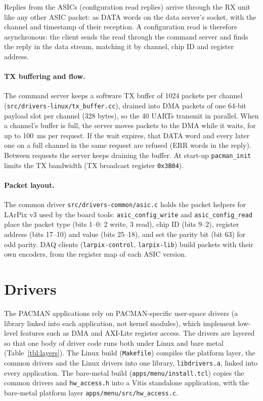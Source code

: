\documentclass[12pt]{article}
\newcommand{\hex}[1]{\texttt{0x#1}}
\newcommand{\f}[1]{\texttt{#1}}
\begin{document}
Replies from the ASICs (configuration read replies) arrive
through the RX unit like any other ASIC packet:  as DATA words on the data server's socket, with the
channel and timestamp of their reception.  A configuration read is therefore asynchronous:  the
client sends the read through the command server and finds the reply in the data stream, matching it
by channel, chip ID and register address.

\paragraph{TX buffering and flow.}  The command server keeps a software TX buffer of 1024 packets
per channel (\f{src/drivers-linux/tx\_buffer.cc}), drained into DMA packets of one 64-bit payload
slot per channel (328 bytes), so the 40 UARTs transmit in parallel.  When a channel's buffer is full,
the server moves packets to the DMA while it waits, for up to 100~ms per request.  If the wait
expires, that DATA word and every later one on a full channel in the same request are refused (ERR
words in the reply).  Between requests the server keeps draining the buffer.  At start-up
\f{pacman\_init} limits the TX bandwidth (TX broadcast register \hex{3B04}).

\paragraph{Packet layout.}  The common driver \f{src/drivers-common/asic.c} holds the packet
helpers for LArPix v3 used by the board tools:  \f{asic\_config\_write} and \f{asic\_config\_read}
place the packet type (bits 1--0:  2 write, 3 read), chip ID (bits 9--2), register address (bits
17--10) and value (bits 25--18), and set the parity bit (bit 63) for odd parity.  DAQ clients
(\f{larpix-control}, \f{larpix-lib}) build packets with their own encoders, from the register map
of each ASIC version.

\section{Drivers}\label{sec:drivers}

The PACMAN applications rely on PACMAN-specific user-space drivers (a library linked into each
application, not kernel modules), which implement low-level features such as DMA and AXI-Lite
register access.  The drivers are layered so that one body of driver code runs both under Linux and bare metal
(Table~\ref{tbl:layers}).  The Linux build (\f{Makefile}) compiles the platform layer, the common
drivers and the Linux drivers into one library, \f{libdrivers.a}, linked into every application.  The
bare-metal build (\f{apps/menu/install.tcl}) copies the common drivers and \f{hw\_access.h} into a
Vitis standalone application, with the bare-metal platform layer \f{apps/menu/src/hw\_access.c}.
\end{document}
